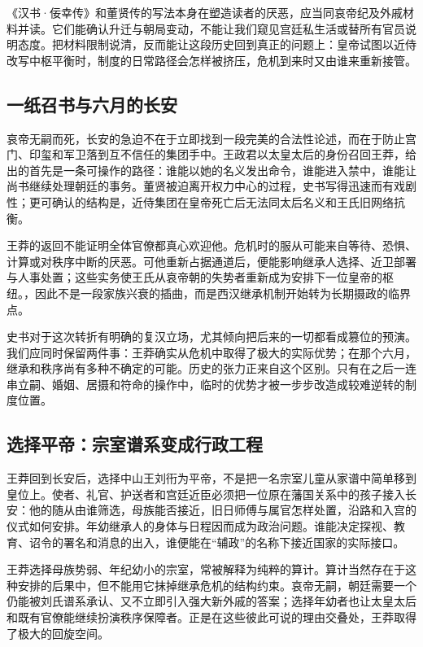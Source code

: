 《汉书·佞幸传》和董贤传的写法本身在塑造读者的厌恶，应当同哀帝纪及外戚材料并读。它们能确认升迁与朝局变动，不能让我们窥见宫廷私生活或替所有官员说明态度。把材料限制说清，反而能让这段历史回到真正的问题上：皇帝试图以近侍改写中枢平衡时，制度的日常路径会怎样被挤压，危机到来时又由谁来重新接管。

\subsection{一纸召书与六月的长安}

哀帝无嗣而死，长安的急迫不在于立即找到一段完美的合法性论述，而在于防止宫门、印玺和军卫落到互不信任的集团手中。王政君以太皇太后的身份召回王莽，给出的首先是一条可操作的路径：谁能以她的名义发出命令，谁能进入禁中，谁能让尚书继续处理朝廷的事务。董贤被迫离开权力中心的过程，史书写得迅速而有戏剧性；更可确认的结构是，近侍集团在皇帝死亡后无法同太后名义和王氏旧网络抗衡。

王莽的返回不能证明全体官僚都真心欢迎他。危机时的服从可能来自等待、恐惧、计算或对秩序中断的厌恶。可他重新占据通道后，便能影响继承人选择、近卫部署与人事处置；这些实务使王氏从哀帝朝的失势者重新成为安排下一位皇帝的枢纽。，因此不是一段家族兴衰的插曲，而是西汉继承机制开始转为长期摄政的临界点。

史书对于这次转折有明确的复汉立场，尤其倾向把后来的一切都看成篡位的预演。我们应同时保留两件事：王莽确实从危机中取得了极大的实际优势；在那个六月，继承和秩序尚有多种不确定的可能。历史的张力正来自这个区别。只有在之后一连串立嗣、婚姻、居摄和符命的操作中，临时的优势才被一步步改造成较难逆转的制度位置。

\subsection{选择平帝：宗室谱系变成行政工程}

王莽回到长安后，选择中山王刘衎为平帝，不是把一名宗室儿童从家谱中简单移到皇位上。使者、礼官、护送者和宫廷近臣必须把一位原在藩国关系中的孩子接入长安：他的随从由谁筛选，母族能否接近，旧日师傅与属官怎样处置，沿路和入宫的仪式如何安排。年幼继承人的身体与日程因而成为政治问题。谁能决定探视、教育、诏令的署名和消息的出入，谁便能在“辅政”的名称下接近国家的实际接口。

王莽选择母族势弱、年纪幼小的宗室，常被解释为纯粹的算计。算计当然存在于这种安排的后果中，但不能用它抹掉继承危机的结构约束。哀帝无嗣，朝廷需要一个仍能被刘氏谱系承认、又不立即引入强大新外戚的答案；选择年幼者也让太皇太后和既有官僚能继续扮演秩序保障者。正是在这些彼此可说的理由交叠处，王莽取得了极大的回旋空间。

